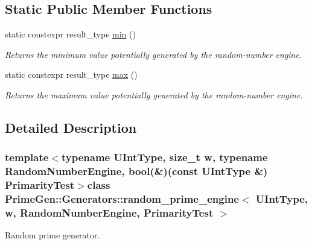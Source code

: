 \subsection*{Static Public Member Functions}
\begin{DoxyCompactItemize}
\item 
static constexpr result\+\_\+type \hyperlink{class_prime_gen_1_1_generators_1_1random__prime__engine_aca7cba717ac90823ba325c6e4d79d1a2}{min} ()
\begin{DoxyCompactList}\small\item\em Returns the minimum value potentially generated by the random-\/number engine. \end{DoxyCompactList}\item 
static constexpr result\+\_\+type \hyperlink{class_prime_gen_1_1_generators_1_1random__prime__engine_a123bf5e419910ff9b04916408fbdd228}{max} ()
\begin{DoxyCompactList}\small\item\em Returns the maximum value potentially generated by the random-\/number engine. \end{DoxyCompactList}\end{DoxyCompactItemize}


\subsection{Detailed Description}
\subsubsection*{template$<$typename U\+Int\+Type, size\+\_\+t w, typename Random\+Number\+Engine, bool(\&)(const U\+Int\+Type \&) Primarity\+Test$>$class Prime\+Gen\+::\+Generators\+::random\+\_\+prime\+\_\+engine$<$ U\+Int\+Type, w, Random\+Number\+Engine, Primarity\+Test $>$}

Random prime generator. 

